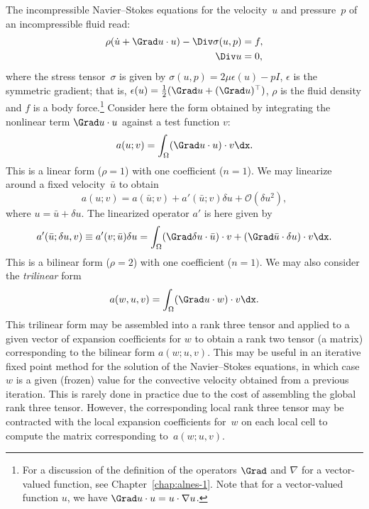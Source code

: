 The incompressible Navier--Stokes equations for the velocity~$u$ and
pressure~$p$ of an incompressible fluid read:
\begin{equation}
  \begin{split}
    \rho(\dot{u} + \Grad u \cdot u) - \Div \sigma(u, p) &= f, \\
    \Div u &= 0,
  \end{split}
\end{equation}
where the stress tensor~$\sigma$ is given by $\sigma(u, p) = 2 \mu
\epsilon(u) - p I$, $\epsilon$ is the symmetric gradient; that is,
$\epsilon(u) = \frac{1}{2}(\Grad u + (\Grad u)^{\top})$, $\rho$ is the
fluid density and $f$ is a body force.\footnote{For a discussion of
the definition of the operators $\Grad$ and $\nabla$ for a
vector-valued function, see Chapter~\ref{chap:alnes-1}. Note that for
a vector-valued function $u$, we have $\Grad u \cdot u =
u \cdot \nabla u$.} Consider here the form obtained by integrating
the nonlinear term $\Grad u \cdot u$ against a test function $v$:
\begin{equation}
  a(u; v) = \int_{\Omega} (\Grad u \cdot u) \cdot v \dx.
\end{equation}
This is a linear form ($\rho = 1$) with one coefficient ($n = 1$). We
may linearize around a fixed velocity~$\bar{u}$ to obtain
\begin{equation}
  a(u; v) = a(\bar{u}; v) + a'(\bar{u}; v) \delta u + \mathcal{O}(\delta u^2),
\end{equation}
where $u = \bar{u} + \delta u$. The linearized operator $a'$ is here
given by
\begin{equation}
  a'(\bar{u}; \delta u, v) \equiv a'(v; \bar{u}) \delta u =
  \int_{\Omega}
  (\Grad \delta u \cdot \bar{u}) \cdot v +
  (\Grad \bar{u} \cdot \delta u) \cdot v \dx.
\end{equation}
This is a bilinear form ($\rho = 2$) with one coefficient ($n = 1)$.
We may also consider the \emph{trilinear} form
\begin{equation}
  a(w, u, v) = \int_{\Omega} (\Grad u \cdot w) \cdot v \dx.
\end{equation}
This trilinear form may be assembled into a rank three tensor and
applied to a given vector of expansion coefficients for $w$ to obtain
a rank two tensor (a matrix) corresponding to the bilinear form $a(w;
u, v)$. This may be useful in an iterative fixed point method for the
solution of the Navier--Stokes equations, in which case $w$ is a given
(frozen) value for the convective velocity obtained from a previous
iteration. This is rarely done in practice due to the cost of
assembling the global rank three tensor. However, the corresponding
local rank three tensor may be contracted with the local expansion
coefficients for~$w$ on each local cell to compute the matrix
corresponding to~$a(w; u, v)$.

